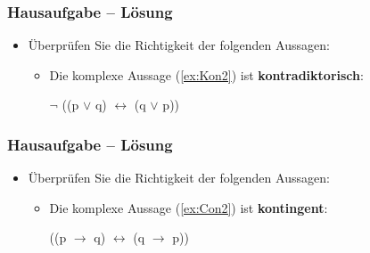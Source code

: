 {\begin{frame}
\end{frame}

\begin{frame}
\frametitle{Hausaufgabe -- Lösung}

\begin{itemize}
	\item Überprüfen Sie die Richtigkeit der folgenden Aussagen:
	
	\vspace{1em}
	
	\begin{itemize}	
		\item Die komplexe Aussage (\ref{ex:Kon2}) ist \textbf{kontradiktorisch}:
		
		\begin{exe}
			 $\lnot$ ((p $\lor$ q) $\leftrightarrow$ (q $\lor$ p))
		\end{exe}		
	\end{itemize}	
	
\end{itemize}

\end{frame}

\begin{frame}
\frametitle{Hausaufgabe -- Lösung}

\begin{itemize}
	\item Überprüfen Sie die Richtigkeit der folgenden Aussagen:
	
	\vspace{1em}
	
	\begin{itemize}
		\item Die komplexe Aussage (\ref{ex:Con2}) ist \textbf{kontingent}:
		
		\begin{exe}
			 ((p $\rightarrow$ q) $\leftrightarrow$ (q $\rightarrow$ p))
		\end{exe}
		
	\end{itemize}	
	
\end{itemize}

\end{frame}

}%


